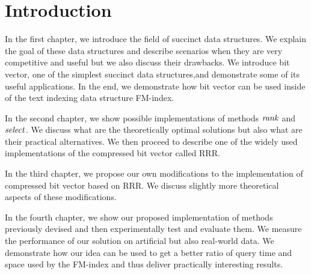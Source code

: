 \chapter*{Introduction} %

In the first chapter, we introduce the field of succinct data structures.
We explain the goal of these data structures and describe scenarios when
they are very competitive and useful but we also discuss their drawbacks.
We introduce bit vector, one of the simplest succinct data structures,and
demonstrate some of its useful applications. In the end, we demonstrate how
bit vector can be used inside of the text indexing data structure FM-index.

In the second chapter, we show possible implementations of methods $\mathit{rank}$ and
$\mathit{select}$. We discuss what are the theoretically optimal solutions but also
what are their practical alternatives. We then proceed to describe one of the
widely used implementations of the compressed bit vector called RRR.

In the third chapter, we propose our own modifications to the implementation of
compressed bit vector based on RRR. We discuss slightly more theoretical aspects
of these modifications.

In the fourth chapter, we show our proposed implementation of methods previously
devised and then experimentally test and evaluate them. We measure the performance
of our solution on artificial but also real-world data. We demonstrate how our
idea can be used to get a better ratio of query time and space used by the FM-index
and thus deliver practically interesting results.